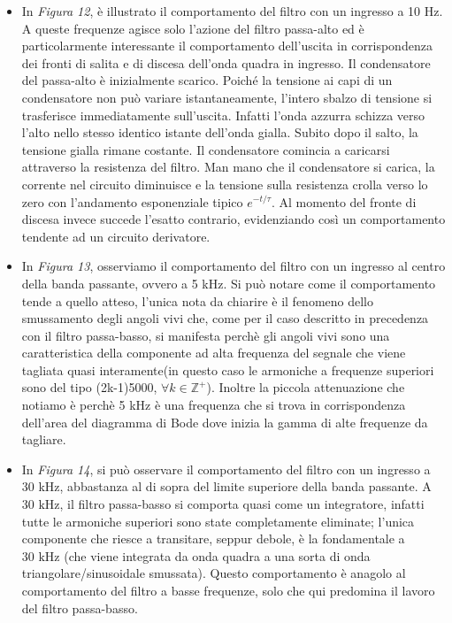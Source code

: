 \documentclass{article}
\begin{document}
\begin{itemize}
      \item In \textit{Figura 12}, è illustrato il comportamento del filtro con un ingresso a 10 Hz. A queste frequenze
            agisce solo l'azione del filtro passa-alto ed è particolarmente interessante il comportamento dell'uscita in
            corrispondenza dei fronti di salita e di discesa dell'onda quadra in ingresso. Il condensatore del passa-alto è
            inizialmente scarico. Poiché la tensione ai capi di un condensatore non può variare istantaneamente, l'intero
            sbalzo di tensione si trasferisce immediatamente sull'uscita. Infatti l'onda azzurra schizza verso l'alto nello
            stesso identico istante dell'onda gialla. Subito dopo il salto, la tensione gialla rimane costante. Il condensatore
            comincia a caricarsi attraverso la resistenza del filtro. Man mano che il condensatore si carica, la corrente nel
            circuito diminuisce e la tensione sulla resistenza crolla verso lo zero con l'andamento esponenziale tipico $e^{-t/\tau}$.
            Al momento del fronte di discesa invece succede l'esatto contrario, evidenziando così un comportamento tendente
            ad un circuito derivatore.

      \item In \textit{Figura 13}, osserviamo il comportamento del filtro con un ingresso al centro della banda passante,
            ovvero a 5 kHz. Si può notare come il comportamento tende a quello atteso, l'unica nota da chiarire è il fenomeno
            dello smussamento degli angoli vivi che, come per il caso descritto in precedenza con il filtro passa-basso, si
            manifesta perchè gli angoli vivi sono una caratteristica della componente ad alta frequenza del segnale che viene
            tagliata quasi interamente(in questo caso le armoniche a frequenze superiori sono del tipo (2k-1)5000, $\forall k \in \mathbb{Z}^+$).
            Inoltre la piccola attenuazione che notiamo è perchè 5 kHz è una frequenza che si trova in corrispondenza dell'area
            del diagramma di Bode dove inizia la gamma di alte frequenze da tagliare.

      \item In \textit{Figura 14}, si può osservare il comportamento del filtro con un ingresso a 30 kHz, abbastanza al di sopra
            del limite superiore della banda passante. A $30\text{ kHz}$, il filtro passa-basso si comporta quasi come un integratore,
            infatti tutte le armoniche superiori sono state completamente eliminate; l'unica componente che riesce a transitare, seppur debole,
            è la fondamentale a $30\text{ kHz}$ (che viene integrata da onda quadra a una sorta di onda triangolare/sinusoidale smussata).
            Questo comportamento è anagolo al comportamento del filtro a basse frequenze, solo che qui predomina il lavoro del filtro passa-basso.
    \end{itemize}
\end{document}
